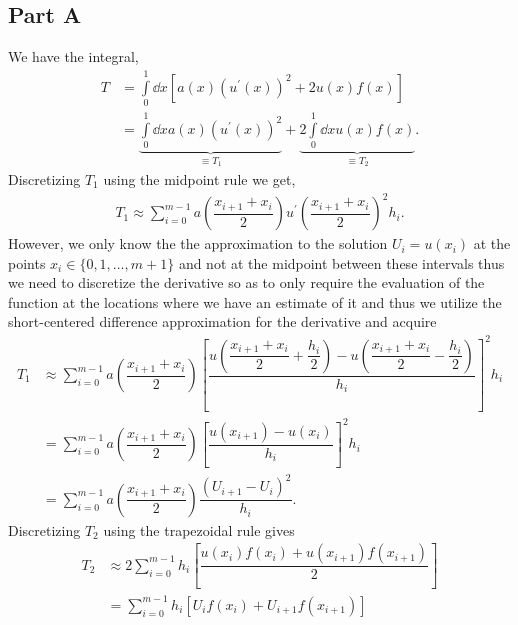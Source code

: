 \documentclass[12pt]{article}
\begin{document}
\subsection{Part A}
We have the integral,
\begin{subequations}
    \begin{align}
        T &= \int\limits_{0}^{1}\dd{x}\left[a(x)(u^{\prime}(x))^{2} + 2u(x)f(x)\right]\\
        &= \underbrace{\int\limits_{0}^{1}\dd{x}a(x)(u^{\prime}(x))^{2}}_{\equiv T_{1}}
        + \underbrace{2\int\limits_{0}^{1}\dd{x}u(x)f(x)}_{\equiv T_{2}}.
    \end{align}
\end{subequations}
Discretizing $T_{1}$ using the midpoint rule we get,
\begin{align}
    T_{1} \approx \sum\limits_{i=0}^{m-1}a\left(\dfrac{x_{i+1}+x_{i}}{2}\right)u^{\prime}\left(\dfrac{x_{i+1}+x_{i}}{2}\right)^{2}h_{i}.
\end{align}
However, we only know the the approximation to the solution $U_{i} = u(x_{i})$ at the points $x_{i}\in\{0,1,\dots,m+1\}$ and not at
the midpoint between these intervals thus we need to discretize the derivative so as to only require the evaluation of the function
at the locations where we have an estimate of it and thus we utilize the short-centered difference approximation for the derivative and acquire
\begin{subequations}
    \begin{align}
        T_{1} &\approx \sum\limits_{i=0}^{m-1}a\left(\dfrac{x_{i+1}+x_{i}}{2}\right)\left[
        \dfrac{u\left(\dfrac{x_{i+1}+x_{i}}{2}+\dfrac{h_{i}}{2}\right)-u\left(\dfrac{x_{i+1}+x_{i}}{2}-\dfrac{h_{i}}{2}\right)}{h_{i}}
        \right]^{2}h_{i}\\
        &= \sum\limits_{i=0}^{m-1}a\left(\dfrac{x_{i+1}+x_{i}}{2}\right)\left[\dfrac{u\left(x_{i+1}\right)-u\left(x_{i}\right)}{h_{i}}\right]^{2}h_{i}\\
        &= \sum\limits_{i=0}^{m-1}a\left(\dfrac{x_{i+1}+x_{i}}{2}\right)\dfrac{\left(U_{i+1}-U_{i}\right)^{2}}{h_{i}}.
    \end{align}
\end{subequations}
Discretizing $T_{2}$ using the trapezoidal rule gives
\begin{subequations}
    \begin{align}
        T_{2} &\approx 2\sum\limits_{i=0}^{m-1} h_{i}\left[\dfrac{u(x_{i})f(x_{i})+u(x_{i+1})f(x_{i+1})}{2}\right]\\
        &= \sum\limits_{i=0}^{m-1} h_{i}\left[U_{i}f(x_{i})+U_{i+1}f(x_{i+1})\right]
    \end{align}
\end{subequations}
\end{document}
